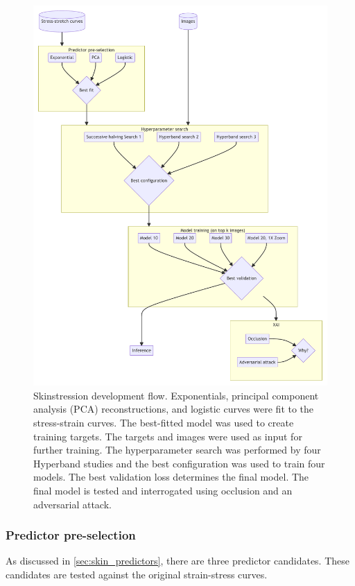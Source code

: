 \begin{figure}[p]
    \centering
    \includegraphics{mermaid/skin_analysis.pdf}
    \caption[Skinstression development flow]{
        Skinstression development flow.
        Exponentials, principal component analysis (PCA) reconstructions, and logistic curves were fit to the stress-strain curves.
        The best-fitted model was used to create training targets.
        The targets and images were used as input for further training.
        The hyperparameter search was performed by four Hyperband studies and the best configuration was used to train four models.
        The best validation loss determines the final model.
        The final model is tested and interrogated using occlusion and an adversarial attack.
    }
    \label{fig:skin_stat_methods}
\end{figure}

\subsubsection{Predictor pre-selection}
As discussed in \cref{sec:skin_predictors}, there are three predictor candidates.
These candidates are tested against the original strain-stress curves.

